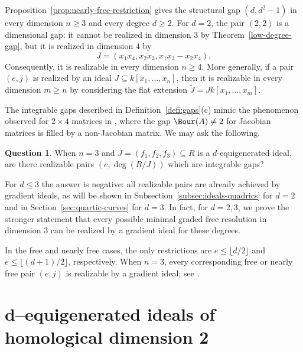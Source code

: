 \documentclass[11pt]{amsart} %
\theoremstyle{definition}
\newtheorem{Question}[Theorem]{Question}
\begin{document}
Proposition~\ref{prop:nearly-free-restriction} gives the structural gap
$(d,d^2-1)$ in every dimension $n\ge3$ and every degree $d\ge2$. For
$d=2$, the pair $(2,2)$ is a dimensional gap: it cannot be realized in
dimension $3$ by Theorem~\ref{low-degree-gap}, but it is realized in
dimension $4$ by
\[
J=(x_1x_4,x_2x_3,x_1x_3-x_2x_4).
\]
Consequently, it is realizable in every dimension $n\ge4$. More
generally, if a pair $(e,j)$ is realized by an ideal
$J\subseteq k[x_1,\ldots,x_n]$, then it is realizable in every dimension
$m\ge n$ by considering the flat extension
$\widetilde J=Jk[x_1,\ldots,x_m]$.

The integrable gaps described in Definition~\ref{defi:gaps}{\rm(c)}
mimic the phenomenon observed for $2\times4$ matrices in
\cite[Section~4]{MFA}, where the gap $\Bour(A)\neq2$ for Jacobian
matrices is filled by a non-Jacobian matrix. We may ask the following.

\begin{Question}\label{question:integrable-gaps}
When $n=3$ and $J=(f_1,f_2,f_3)\subseteq R$ is a $d$-equigenerated
ideal, are there realizable pairs $(e,\deg(R/J))$ which are integrable
gaps?
\end{Question}

For $d\leq 3$ the answer is negative: all realizable pairs are
already achieved by gradient ideals, as will be shown in
Subsection~\ref{subsec:ideals-quadrics} for $d = 2$ and in Section~\ref{sec:quartic-curves} for $d = 3$. In fact, for $d = 2, 3$, we
prove the stronger statement that every possible minimal graded free resolution in dimension $3$ can be realized by a gradient ideal for these degrees.

In the free and nearly free cases, the only restrictions are
$e\le\lfloor d/2\rfloor$ and $e\le\lfloor(d+1)/2\rfloor$, respectively.
When $n=3$, every corresponding free or nearly free pair $(e,j)$ is
realizable by a gradient ideal; see
\cite[Theorems~1.1, 1.2, and 3.1]{dimca2017exponents}.

\section{d--equigenerated ideals of homological dimension 2}\label{sec:hom-dim-2}
\end{document}
